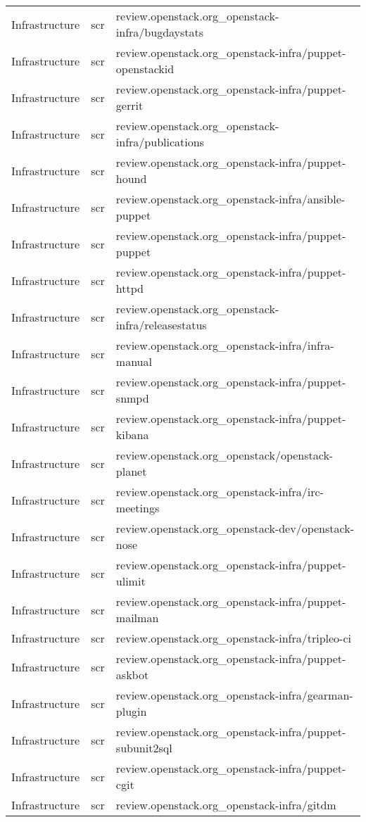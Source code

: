\begin{center}
\begin{longtable}{|p{4cm}|p{1cm}|p{10cm}|}
Infrastructure&scr&review.openstack.org\_openstack-infra/bugdaystats\\ 
Infrastructure&scr&review.openstack.org\_openstack-infra/puppet-openstackid\\ 
Infrastructure&scr&review.openstack.org\_openstack-infra/puppet-gerrit\\ 
Infrastructure&scr&review.openstack.org\_openstack-infra/publications\\ 
Infrastructure&scr&review.openstack.org\_openstack-infra/puppet-hound\\ 
Infrastructure&scr&review.openstack.org\_openstack-infra/ansible-puppet\\ 
Infrastructure&scr&review.openstack.org\_openstack-infra/puppet-puppet\\ 
Infrastructure&scr&review.openstack.org\_openstack-infra/puppet-httpd\\ 
Infrastructure&scr&review.openstack.org\_openstack-infra/releasestatus\\ 
Infrastructure&scr&review.openstack.org\_openstack-infra/infra-manual\\ 
Infrastructure&scr&review.openstack.org\_openstack-infra/puppet-snmpd\\ 
Infrastructure&scr&review.openstack.org\_openstack-infra/puppet-kibana\\ 
Infrastructure&scr&review.openstack.org\_openstack/openstack-planet\\ 
Infrastructure&scr&review.openstack.org\_openstack-infra/irc-meetings\\ 
Infrastructure&scr&review.openstack.org\_openstack-dev/openstack-nose\\ 
Infrastructure&scr&review.openstack.org\_openstack-infra/puppet-ulimit\\ 
Infrastructure&scr&review.openstack.org\_openstack-infra/puppet-mailman\\ 
Infrastructure&scr&review.openstack.org\_openstack-infra/tripleo-ci\\ 
Infrastructure&scr&review.openstack.org\_openstack-infra/puppet-askbot\\ 
Infrastructure&scr&review.openstack.org\_openstack-infra/gearman-plugin\\ 
Infrastructure&scr&review.openstack.org\_openstack-infra/puppet-subunit2sql\\ 
Infrastructure&scr&review.openstack.org\_openstack-infra/puppet-cgit\\ 
Infrastructure&scr&review.openstack.org\_openstack-infra/gitdm\\ 

\end{longtable}
\end{center}
